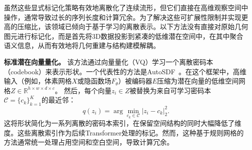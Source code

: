 \documentclass[../../book-main_zh.tex]{subfiles}
\begin{document}
\begin{itemize}

\end{itemize}

虽然这些显式标记化策略有效地离散化了连续流形，但它们直接在高维观察空间中操作，通常导致过长的序列长度和计算冗余。为了解决这些可扩展性限制并实现更高的压缩比，该领域已倾向于基于学习的离散表示。以下方法没有直接对原始几何图元进行标记化，而是首先将3D数据投影到紧凑的低维潜在空间中，在其中聚合语义信息，从而有效地将几何重建与结构建模解耦。

\textbf{标准潜在向量量化。} 该方法通过向量量化（VQ）学习一个离散密码本（codebook）来表示形状。一个代表性的方法是AutoSDF~\cite{mittal2022autosdf}。在这个框架中，高维输入（例如，体素网格$X$或隐函数场$F_\theta$）被编码器$E$压缩为潜在向量的低维空间网格$Z \in \mathbb{R}^{h \times w \times d \times c}$。
然后，每个向量$z_i \in Z$被替换为来自可学习密码本$\mathcal{C}=\{c_k\}_{k=1}^K$的最近邻：
\begin{equation}
q(z_i) = \arg\min_{c_k \in \mathcal{C}} | z_i - c_k |_2^2.
\end{equation}
这将形状简化为一系列离散的密码本索引，在保留空间结构的同时大幅降低了维度。这些离散索引作为后续Transformer处理的标记。然而，这种基于规则网格的方法通常统一处理占用空间和空白空间，导致计算冗余。

\end{document}
